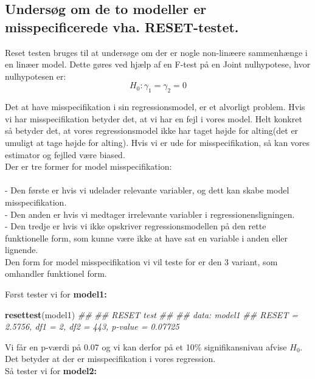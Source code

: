 \documentclass[
  10pt,
]{article}
\newenvironment{Shaded}{\begin{snugshade}}{\end{snugshade}}
\newcommand{\CommentTok}[1]{\textcolor[rgb]{0.56,0.35,0.01}{\textit{#1}}}
\newcommand{\KeywordTok}[1]{\textcolor[rgb]{0.13,0.29,0.53}{\textbf{#1}}}
\newcommand{\NormalTok}[1]{#1}
\begin{document}
\hypertarget{undersuxf8g-om-de-to-modeller-er-misspecificerede-vha.-reset-testet.}{%
\subsection{Undersøg om de to modeller er misspecificerede vha.
RESET-testet.}\label{undersuxf8g-om-de-to-modeller-er-misspecificerede-vha.-reset-testet.}}

\leavevmode

Reset testen bruges til at undersøge om der er nogle non-linæere
sammenhænge i en linæer model. Dette gøres ved hjælp af en F-test på en
Joint nulhypotese, hvor nulhypotesen er: \[ H_0:\gamma_1=\gamma_2=0\]

Det at have misspecifikation i sin regressionsmodel, er et alvorligt
problem. Hvis vi har misspecifikation betyder det, at vi har en fejl i
vores model. Helt konkret så betyder det, at vores regressionsmodel ikke
har taget højde for alting(det er umuligt at tage højde for alting).
Hvis vi er ude for misspecifikation, så kan vores estimator og fejlled
være biased.\\
Der er tre former for model misspecifikation:\\
~\\
- Den første er hvis vi udelader relevante variabler, og dett kan skabe
model misspecifikation.\\
- Den anden er hvis vi medtager irrelevante variabler i
regressionensligningen.\\
- Den tredje er hvis vi ikke opskriver regressionsmodellen på den rette
funktionelle form, som kunne være ikke at have sat en variable i anden
eller lignende.\\

Den form for model misspecifikation vi vil teste for er den 3 variant,
som omhandler funktionel form.

Først tester vi for \textbf{model1:}

\begin{Shaded}
\begin{Highlighting}[]
\KeywordTok{resettest}\NormalTok{(model1)}
\CommentTok{## }
\CommentTok{##  RESET test}
\CommentTok{## }
\CommentTok{## data:  model1}
\CommentTok{## RESET = 2.5756, df1 = 2, df2 = 443, p-value = 0.07725}
\end{Highlighting}
\end{Shaded}

Vi får en p-værdi på 0.07 og vi kan derfor på et 10\% signifikansnivau
afvise \(H_0\). Det betyder at der er misspecifikation i vores
regression.\\
Så tester vi for \textbf{model2:}
\end{document}
